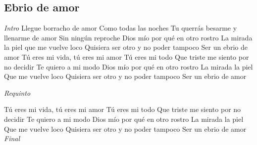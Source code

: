 \subsection{Ebrio de amor}
\noindent

\vspace{1cm}

\begin{guitar}
	\begin{multicols}{2}
		\textit{Intro}
		Llegue borracho de amor
	Como todas las noches
	Tu querrás besarme y llenarme de amor
	Sin ningún reproche
	Dios mío por qué en otro rostro
	La mirada la piel que me vuelve loco
	Quisiera ser otro y no poder tampoco
	Ser un ebrio de amor
	Tú eres mi vida, tú eres mi amor
	Tú eres mi todo
	Que triste me siento por no decidir
	Te quiero a mi modo
	Dios mío por qué en otro rostro
	La mirada la piel
	Que me vuelve loco
	Quisiera ser otro y no poder tampoco
	Ser un ebrio de amor

	\par
	\textit{Requinto}
	\par

	Tú eres mi vida, tú eres mi amor
	Tú eres mi todo
	Que triste me siento por no decidir
	Te quiero a mi modo
	Dios mío por qué en otro rostro
	La mirada la piel
	Que me vuelve loco
	Quisiera ser otro y no poder tampoco
	Ser un ebrio de amor
		\textit{Final}
	\end{multicols}
\end{guitar}
